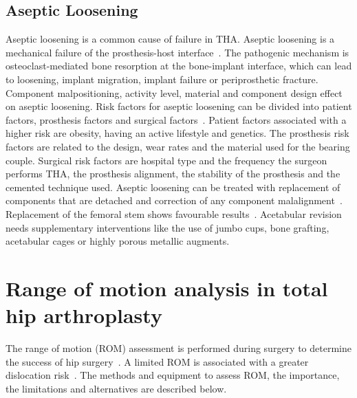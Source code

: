 \documentclass[whitelogo]{tudelft-report}
\begin{document}
{\subsection{Aseptic Loosening}
Aseptic loosening is a common cause of failure in THA. Aseptic loosening is a mechanical failure of the prosthesis-host interface~\cite{pivec2012hip}. The pathogenic mechanism is osteoclast-mediated bone resorption at the bone-implant interface, which can lead to loosening, implant migration, implant failure or periprosthetic fracture. Component malpositioning, activity level, material and component design effect on aseptic loosening. 
Risk factors for aseptic loosening can be divided into patient factors, prosthesis factors and surgical factors~\cite{macinnes2012risk}. Patient factors associated with a higher risk are obesity, having an active lifestyle and genetics. The prosthesis risk factors are related to the design, wear rates and the material used for the bearing couple. Surgical risk factors are hospital type and the frequency the surgeon performs THA, the prosthesis alignment, the stability of the prosthesis and the cemented technique used.
	Aseptic loosening can be treated with replacement of components that are detached and correction of any component malalignment~\cite{pivec2012hip}. Replacement of the femoral stem shows favourable results~\cite{khanuja2011cementless}\cite{jones2004modular}. Acetabular revision needs supplementary interventions like the use of jumbo cups, bone grafting, acetabular cages or highly porous metallic augments.
	
\section{Range of motion analysis in total hip arthroplasty}
The range of motion (ROM) assessment is performed during surgery to determine the success of hip surgery~\cite{harris1980advances}. A limited ROM is associated with a greater dislocation risk~\cite{tanino2018hip}. The methods and equipment to assess ROM, the importance, the limitations and alternatives are described below.
	
}
\end{document}
